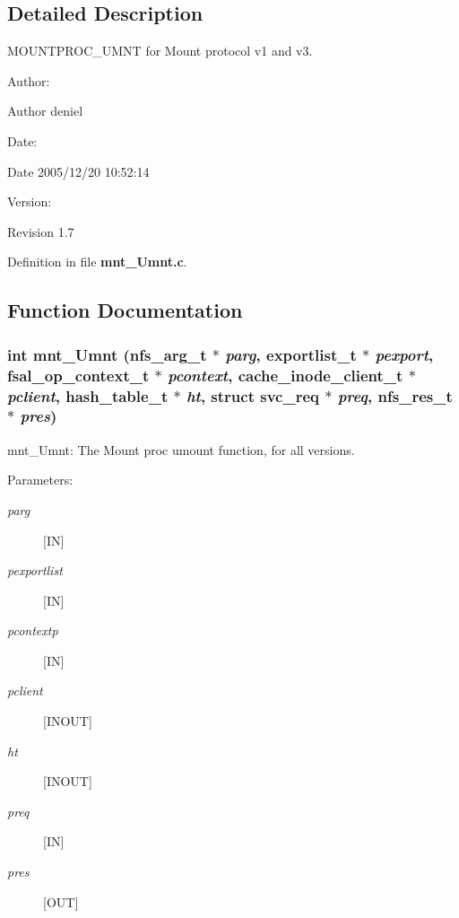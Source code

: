 \subsection{Detailed Description}
MOUNTPROC\_\-UMNT for Mount protocol v1 and v3. 

\begin{Desc}
\item[Author:]\begin{Desc}
\item[Author]deniel \end{Desc}
\end{Desc}
\begin{Desc}
\item[Date:]\begin{Desc}
\item[Date]2005/12/20 10:52:14 \end{Desc}
\end{Desc}
\begin{Desc}
\item[Version:]\begin{Desc}
\item[Revision]1.7 \end{Desc}
\end{Desc}


Definition in file {\bf mnt\_\-Umnt.c}.

\subsection{Function Documentation}
\subsubsection{\setlength{\rightskip}{0pt plus 5cm}int mnt\_\-Umnt (nfs\_\-arg\_\-t $\ast$ {\em parg}, exportlist\_\-t $\ast$ {\em pexport}, fsal\_\-op\_\-context\_\-t $\ast$ {\em pcontext}, cache\_\-inode\_\-client\_\-t $\ast$ {\em pclient}, hash\_\-table\_\-t $\ast$ {\em ht}, struct svc\_\-req $\ast$ {\em preq}, nfs\_\-res\_\-t $\ast$ {\em pres})}\label{mnt__Umnt_8c_a0}


mnt\_\-Umnt: The Mount proc umount function, for all versions.

\begin{Desc}
\item[Parameters:]
\begin{description}
\item[{\em parg}][IN] \item[{\em pexportlist}][IN] \item[{\em pcontextp}][IN] \item[{\em pclient}][INOUT] \item[{\em ht}][INOUT] \item[{\em preq}][IN] \item[{\em pres}][OUT] \end{description}
\end{Desc}


